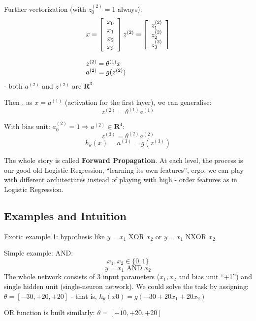 \documentclass{scrartcl}
\begin{document}
Further vectorization (with $z_0^{(2)} = 1$ always):
\begin{equation*}
  \label{eq:8-4:02:25}
  \begin{array}[c]{l}
    x = \left[  \begin{array}[c]{c}   x_0 \\ x_1 \\ x_2 \\ x_3 \end{array} \right]
    z^{(2)} = \left[\begin{array}[c]{c} z_1^{(2)} \\ z_2^{(2)}
        \\ z_3^{(2)} \end{array} \right] 
    \\ \\    z^{(2)} = \theta^{(1)}x 
    \\    a^{(2)} = g(z^{(2)})
  \end{array}
\end{equation*}
- both $a^{(2)}$ and $z^{(2)}$ are $\mathbf{R}^3$

Then , as $x = a^{(1)}$ (activation for the first layer), we can
generalise: \[ z^{(2)} = \theta^{(1)} a^{(1)}\]

With bias unit: $a_0^{(2)} = 1 \Rightarrow a^{(2)} \in
\mathbf{R}^4$: \[ z^{(3)} = \theta^{(2)}a^{(2)} \]
\[ h_\theta(x) = a^{(3)} = g(z^{(3)})\]

The whole story is called {\bf Forward Propagation}. At each level,
the process is our good old Logistic Regression, ``learning its own
features'', ergo, we can play with different architectures instead of
playing with high - order features as in Logistic Regression.

\subsection{Examples and Intuition}
\label{sec:8-5}
Exotic example 1: hypothesis like $y = x_1 \textrm{ XOR } x_2$ or $y =
x_1 \textrm{ NXOR } x_2$

Simple example: AND:
\[ x_1, x_2 \in \{0, 1\}\] \[ y = x_1 \textrm{ AND } x_2 \] The whole
network consists of 3 input parameters ($x_1, x_2$ and bias unit
``+1'') and single hidden unit (single-neuron network). We could solve
the task by assigning: $ \theta = [-30, +20, +20]$ - that is,
$h_\theta(x0) = g(-30 + 20 x_1 + 20 x_2)$

OR function is built similarly: $ \theta = [-10, +20, +20]$
\end{document}
